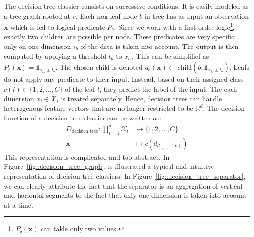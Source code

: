                 The decision tree classier consists on successive conditions.
                It is easily modeled as a tree graph rooted at $r$.
                Each non leaf node $b$ in tree has as input an observation $\bm{x}$ which is fed to logical predicate $P_b$.
                Since we work with a first order logic\footnote{$P_b(\bm{x})$ can takle only two values.}, exactly two children are possible per node.
                These predicates are very specific: only on one dimension $i_b$ of the data is taken into account.
                The output is then computed by applying a threshold $t_b$ to $x_{i_b}$.
                This can be simplifief as $P_b(\bm{x}) = \mathbb{1}_{x_{i_b} \geq t_b} $.
                The chosen child is denoted $d_b(\bm{x}) \leftarrow \text{child}(b, \mathbb{1}_{x_{i_b} \geq t_b})$.
                Leafs do not apply any predicate to their input.
                Instead, based on their assigned class $c(l) \in \{1,2,\dots,C\}$ of the leaf $l$, they predict the label of the input.
                The each dimension $x_i \in \mathscr{X}_i$ is treated separately.
                Hence, decision trees can handle heterogenous feature vectors that are no longer restricted to be $\mathbb{R}^d$.
                The decision function of a decision tree classier can be written as:
                \begin{equation}
                    \label{eq::df_decision_tree}
                    \begin{aligned}
                        D_{\text{decision tree}}: \prod_{i=1}^{d}\mathscr{X}_i &\rightarrow \{1,2,\dots,C\}\\
                        \bm{x} &\mapsto c\left(d_{d_{\ddots_{d_r(\bm{x})}}(\bm{x})}\right)
                    \end{aligned}
                \end{equation}
                This representation is complicated and too abstract.
                In Figure~\ref{fig::decision_tree_graph}, is illustrated a typical and intuitive representation of decision tree classiers.
                In Figure~\ref{fig::decision_tree_separator}, we can clearly attribute the fact that the separator is an aggregation of vertical and horiontal segments to the fact that only one dimension is taken into acoount at a time.\\

